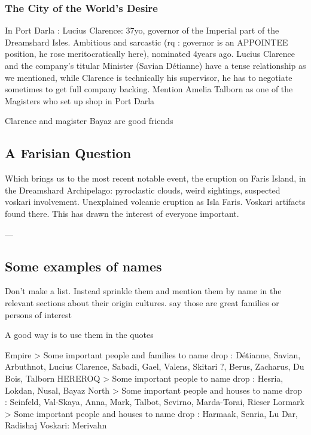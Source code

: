 \subsubsection{The City of the World's Desire}

In Port Darla : Lucius Clarence: 37yo, governor of the Imperial part of the Dreamshard Isles. Ambitious and sarcastic (rq : governor is an APPOINTEE position, he rose meritocratically here), nominated 4years ago. Lucius Clarence and the company's titular Minister (Savian Détianne) have a tense relationship as we mentioned, while Clarence is technically his supervisor, he has to negotiate sometimes to get full company backing. Mention Amelia Talborn as one of the Magisters who set up shop in Port Darla

Clarence and magister Bayaz are good friends


\subsection{A Farisian Question}

Which brings us to the most recent notable event, the eruption on Faris Island, in the Dreamshard Archipelago: pyroclastic clouds, weird sightings, suspected voskari involvement. Unexplained volcanic eruption as Isla Faris. Voskari artifacts found there. This has drawn the interest of everyone important.



---



\subsection{Some examples of names}

Don't make a list. Instead sprinkle them and mention them by name in the relevant sections about their origin cultures. say those are great families or persons of interest

A good way is to use them in the quotes

Empire > Some important people and families to name drop : Détianne, Savian, Arbuthnot, Lucius Clarence, Sabadi, Gael, Valens, Skitari ?, Berus, Zacharus, Du Bois, Talborn
HEREROQ > Some important people to name drop : Hesria, Lokdan, Nusal, Bayaz
North > Some important people and houses to name drop : Seinfeld, Val-Skaya, Anna, Mark, Talbot, Sevirno, Marda-Torai, Rieser
Lormark > Some important people and houses to name drop : Harmaak, Senria, Lu Dar, Radishaj
Voskari: Merivahn

